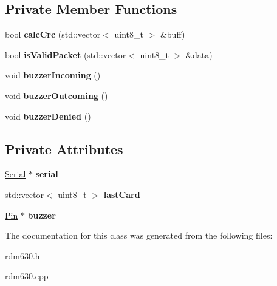 \subsection*{Private Member Functions}
\begin{DoxyCompactItemize}
\item 
\mbox{\label{classRdm6300_a5a57029ca033dfb57dacb8af1279a63c}} 
bool {\bfseries calc\+Crc} (std\+::vector$<$ uint8\+\_\+t $>$ \&buff)
\item 
\mbox{\label{classRdm6300_a11bf89a8c306cdf0c329eb535d20c154}} 
bool {\bfseries is\+Valid\+Packet} (std\+::vector$<$ uint8\+\_\+t $>$ \&data)
\item 
\mbox{\label{classRdm6300_a38956667d6cd8aa2746bcdbe8de77e0c}} 
void {\bfseries buzzer\+Incoming} ()
\item 
\mbox{\label{classRdm6300_a81a9625c32a797937fecfee9268ac79d}} 
void {\bfseries buzzer\+Outcoming} ()
\item 
\mbox{\label{classRdm6300_a067a47af67954c2e845743ea5de3ebb0}} 
void {\bfseries buzzer\+Denied} ()
\end{DoxyCompactItemize}
\subsection*{Private Attributes}
\begin{DoxyCompactItemize}
\item 
\mbox{\label{classRdm6300_aab29f639a26cfce2ef7865f829efc1d4}} 
\hyperlink{classSerial}{Serial} $\ast$ {\bfseries serial}
\item 
\mbox{\label{classRdm6300_ab67e1bc66505b024850419b28cb44371}} 
std\+::vector$<$ uint8\+\_\+t $>$ {\bfseries last\+Card}
\item 
\mbox{\label{classRdm6300_adbb47250f01692e5394006137e50a1fa}} 
\hyperlink{classPin}{Pin} $\ast$ {\bfseries buzzer}
\end{DoxyCompactItemize}


The documentation for this class was generated from the following files\+:\begin{DoxyCompactItemize}
\item 
\hyperlink{rdm630_8h}{rdm630.\+h}\item 
rdm630.\+cpp\end{DoxyCompactItemize}
